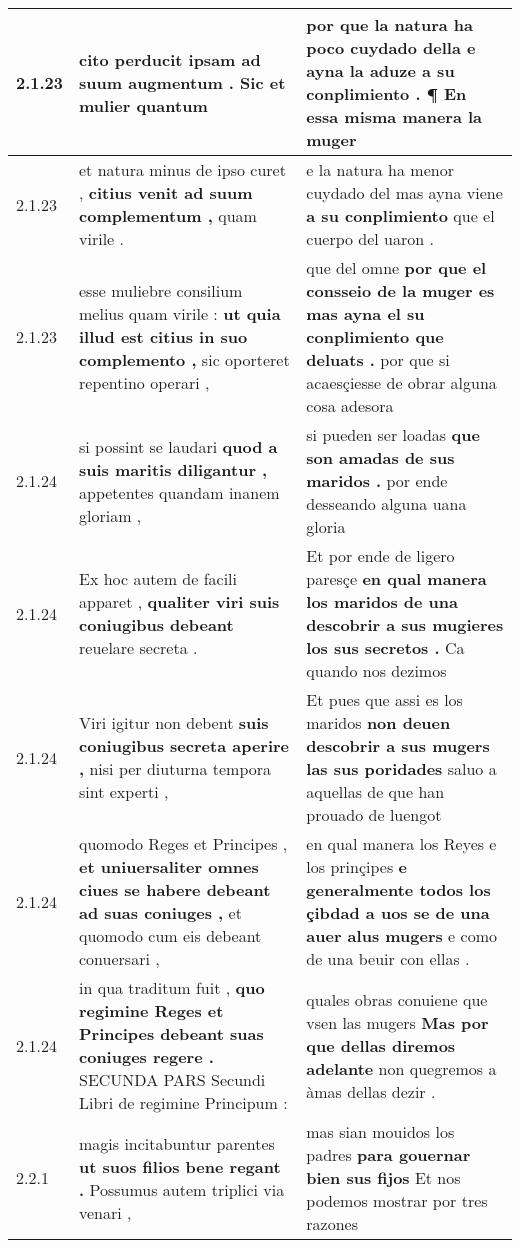 \begin{tabular}{|p{1cm}|p{6.5cm}|p{6.5cm}|}
2.1.23 & cito perducit \textbf{ ipsam ad suum augmentum . } Sic et mulier quantum & por que la natura ha poco cuydado della \textbf{ e ayna la aduze a su conplimiento . } ¶ En essa misma manera la muger \\\hline
2.1.23 & et natura minus de ipso curet , \textbf{ citius venit ad suum complementum , } quam virile . & e la natura ha menor cuydado del mas ayna viene \textbf{ a su conplimiento } que el cuerpo del uaron . \\\hline
2.1.23 & esse muliebre consilium melius quam virile : \textbf{ ut quia illud est citius in suo complemento , } sic oporteret repentino operari , & que del omne \textbf{ por que el consseio de la muger es mas ayna el su conplimiento que deluats . } por que si acaesçiesse de obrar alguna cosa adesora \\\hline
2.1.24 & si possint se laudari \textbf{ quod a suis maritis diligantur , } appetentes quandam inanem gloriam , & si pueden ser loadas \textbf{ que son amadas de sus maridos . } por ende desseando alguna uana gloria \\\hline
2.1.24 & Ex hoc autem de facili apparet , \textbf{ qualiter viri suis coniugibus debeant } reuelare secreta . & Et por ende de ligero paresçe \textbf{ en qual manera los maridos de una descobrir a sus mugieres los sus secretos . } Ca quando nos dezimos \\\hline
2.1.24 & Viri igitur non debent \textbf{ suis coniugibus secreta aperire , } nisi per diuturna tempora sint experti , & Et pues que assi es los maridos \textbf{ non deuen descobrir a sus mugers las sus poridades } saluo a aquellas de que han prouado de luengot \\\hline
2.1.24 & quomodo Reges et Principes , \textbf{ et uniuersaliter omnes ciues se habere debeant ad suas coniuges , } et quomodo cum eis debeant conuersari , & en qual manera los Reyes e los prinçipes \textbf{ e generalmente todos los çibdad a uos se de una auer alus mugers } e como de una beuir con ellas . \\\hline
2.1.24 & in qua traditum fuit , \textbf{ quo regimine Reges et Principes debeant suas coniuges regere . } SECUNDA PARS Secundi Libri de regimine Principum : & quales obras conuiene que vsen las mugers \textbf{ Mas por que dellas diremos adelante } non quegremos a àmas dellas dezir . \\\hline
2.2.1 & magis incitabuntur parentes \textbf{ ut suos filios bene regant . } Possumus autem triplici via venari , & mas sian mouidos los padres \textbf{ para gouernar bien sus fijos } Et nos podemos mostrar por tres razones \\\hline

\end{tabular}

